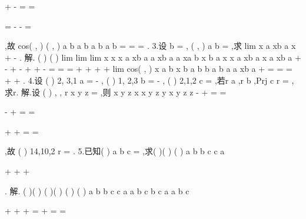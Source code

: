 +
\cdots 
-
=
=
\cdots 


\Rightarrow 


=
\cdots 
-
\cdots 
-
=



\rho 
\rho 
\rho 
\rho 
\rho 
\rho 
\rho 
\rho 
\rho 
\rho 
\rho 
\rho 
\rho 
\rho 
,故
\cdot 
\cdot 
cos( , )
( , )
a b
a b
a b
a b
\pi 
\cdots 
=
=
\Rightarrow 
=
\rho 
\rho 
\rho 
\rho 
\rho 
\rho 
\rho 
\rho 
. 
3.设
b =
\rho 
, \cdot 
( , )
a b
\pi 
=
\rho 
\rho 
,求
lim
x
a
xb
a
x
\to 
+
-
\rho 
\rho 
\rho 
. 
解.
(
)
(
)
lim
lim
lim
x
x
x
a
xb
a
a
xb
a
a
xa b
x b
a
x
x a
xb
a
x a
xb
a
\to 
\to 
\to 
+
-
+
-
+
\cdots 
+
-
=
=
=
+
+
+
+
\rho 
\rho 
\rho 
\rho 
\rho 
\rho 
\rho 
\rho 
\rho 
\rho 
\rho 
\rho 
\rho 
\rho 
\rho 
\rho 
\rho 
\cdot 
lim
cos( , )
x
a b
x b
a b
b
a b
a
a
xb
a
\to 
\cdots 
+
\cdots 
=
=
=
+
+
\rho 
\rho 
\rho 
\rho 
\rho 
\rho 
\rho 
\rho 
\rho 
\rho 
\rho 
\rho 
. 
4.设
(
)
2, 3,1
a =
-
\rho 
,
(
)
1, 2,3
b =
-
\rho 
,
(
)
2,1,2
c =
\rho 
,若r
a
\bot
\rho 
\rho ,r
b
\bot
\rho 
\rho 
,Prj
c r =
\rho \rho 
,求r\rho . 
解.设
(
)
, ,
r
x y z
=
\rho 
,则
x
y
z
x
x
y
z
y
x
y
z
z
-
+
=
=




-
+
=
\Rightarrow 
=




+
+
=
=


,故
(
)
14,10,2
r =
\rho 
. 
5.已知(
)
a
b
c
\times 
\cdots 
=
\rho 
\rho 
\rho 
,求(
)(
)
(
)
a
b
b
c
c
a


+
\times 
+
\cdots 
+


\rho 
\rho 
\rho 
\rho 
\rho 
\rho . 
解. (
)(
)
(
)(
)
(
)
(
)
a
b
b
c
c
a
a
b
c
b
c
a
a
b
c


+
\times 
+
\cdots 
+
=
\times 
\cdots 
+
\times 
\cdots 
=
\times 
\cdots 
=



